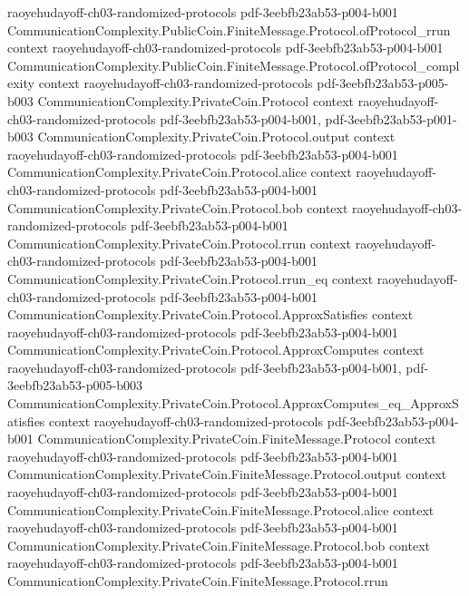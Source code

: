 \begin{theorem}
  {raoyehudayoff-ch03-randomized-protocols}
  {pdf-3eebfb23ab53-p004-b001}
\proofstep
  {CommunicationComplexity.PublicCoin.FiniteMessage.Protocol.ofProtocol_rrun}
  {context}
  {raoyehudayoff-ch03-randomized-protocols}
  {pdf-3eebfb23ab53-p004-b001}
\proofstep
  {CommunicationComplexity.PublicCoin.FiniteMessage.Protocol.ofProtocol_complexity}
  {context}
  {raoyehudayoff-ch03-randomized-protocols}
  {pdf-3eebfb23ab53-p005-b003}
\proofstep
  {CommunicationComplexity.PrivateCoin.Protocol}
  {context}
  {raoyehudayoff-ch03-randomized-protocols}
  {pdf-3eebfb23ab53-p004-b001,
    pdf-3eebfb23ab53-p001-b003}
\proofstep
  {CommunicationComplexity.PrivateCoin.Protocol.output}
  {context}
  {raoyehudayoff-ch03-randomized-protocols}
  {pdf-3eebfb23ab53-p004-b001}
\proofstep
  {CommunicationComplexity.PrivateCoin.Protocol.alice}
  {context}
  {raoyehudayoff-ch03-randomized-protocols}
  {pdf-3eebfb23ab53-p004-b001}
\proofstep
  {CommunicationComplexity.PrivateCoin.Protocol.bob}
  {context}
  {raoyehudayoff-ch03-randomized-protocols}
  {pdf-3eebfb23ab53-p004-b001}
\proofstep
  {CommunicationComplexity.PrivateCoin.Protocol.rrun}
  {context}
  {raoyehudayoff-ch03-randomized-protocols}
  {pdf-3eebfb23ab53-p004-b001}
\proofstep
  {CommunicationComplexity.PrivateCoin.Protocol.rrun_eq}
  {context}
  {raoyehudayoff-ch03-randomized-protocols}
  {pdf-3eebfb23ab53-p004-b001}
\proofstep
  {CommunicationComplexity.PrivateCoin.Protocol.ApproxSatisfies}
  {context}
  {raoyehudayoff-ch03-randomized-protocols}
  {pdf-3eebfb23ab53-p004-b001}
\proofstep
  {CommunicationComplexity.PrivateCoin.Protocol.ApproxComputes}
  {context}
  {raoyehudayoff-ch03-randomized-protocols}
  {pdf-3eebfb23ab53-p004-b001,
    pdf-3eebfb23ab53-p005-b003}
\proofstep
  {CommunicationComplexity.PrivateCoin.Protocol.ApproxComputes_eq_ApproxSatisfies}
  {context}
  {raoyehudayoff-ch03-randomized-protocols}
  {pdf-3eebfb23ab53-p004-b001}
\proofstep
  {CommunicationComplexity.PrivateCoin.FiniteMessage.Protocol}
  {context}
  {raoyehudayoff-ch03-randomized-protocols}
  {pdf-3eebfb23ab53-p004-b001}
\proofstep
  {CommunicationComplexity.PrivateCoin.FiniteMessage.Protocol.output}
  {context}
  {raoyehudayoff-ch03-randomized-protocols}
  {pdf-3eebfb23ab53-p004-b001}
\proofstep
  {CommunicationComplexity.PrivateCoin.FiniteMessage.Protocol.alice}
  {context}
  {raoyehudayoff-ch03-randomized-protocols}
  {pdf-3eebfb23ab53-p004-b001}
\proofstep
  {CommunicationComplexity.PrivateCoin.FiniteMessage.Protocol.bob}
  {context}
  {raoyehudayoff-ch03-randomized-protocols}
  {pdf-3eebfb23ab53-p004-b001}
\proofstep
  {CommunicationComplexity.PrivateCoin.FiniteMessage.Protocol.rrun}

\end{theorem}
